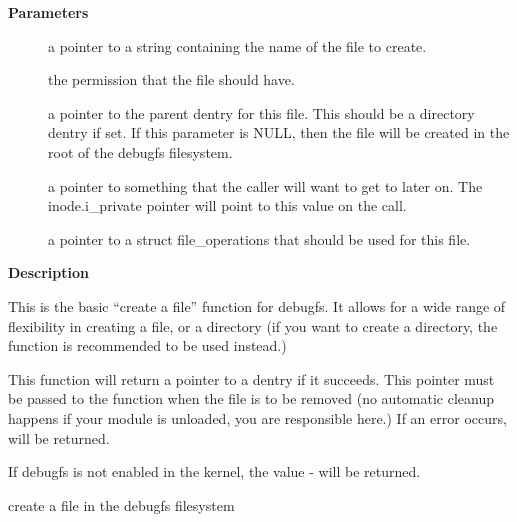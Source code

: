 \documentclass[a4paper,8pt,english]{sphinxmanual}
\begin{document}
\textbf{Parameters}
\begin{description}
\item[{}] \leavevmode
a pointer to a string containing the name of the file to create.

\item[{}] \leavevmode
the permission that the file should have.

\item[{}] \leavevmode
a pointer to the parent dentry for this file.  This should be a
directory dentry if set.  If this parameter is NULL, then the
file will be created in the root of the debugfs filesystem.

\item[{}] \leavevmode
a pointer to something that the caller will want to get to later
on.  The inode.i\_private pointer will point to this value on
the  call.

\item[{}] \leavevmode
a pointer to a struct file\_operations that should be used for
this file.

\end{description}

\textbf{Description}

This is the basic ``create a file'' function for debugfs.  It allows for a
wide range of flexibility in creating a file, or a directory (if you want
to create a directory, the {\hyperref[filesystems/index:c.debugfs_create_dir]{\emph{}}} function is
recommended to be used instead.)

This function will return a pointer to a dentry if it succeeds.  This
pointer must be passed to the {\hyperref[filesystems/index:c.debugfs_remove]{\emph{}}} function when the file is
to be removed (no automatic cleanup happens if your module is unloaded,
you are responsible here.)  If an error occurs,  will be returned.

If debugfs is not enabled in the kernel, the value - will be
returned.

\begin{fulllineitems}
\label{filesystems/index:c.debugfs_create_file_unsafe}
create a file in the debugfs filesystem

\end{fulllineitems}
\end{document}
